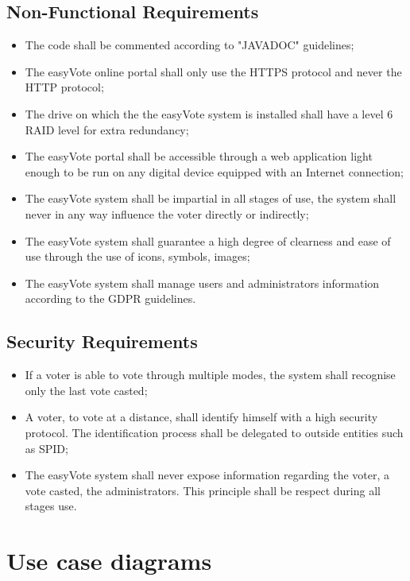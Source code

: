 \documentclass[11pt, oneside]{article}   	%
\begin{document}
\subsection{Non-Functional Requirements}
\begin{itemize}
\item The code shall be commented according to "JAVADOC" guidelines;
\item The easyVote online portal shall only use the HTTPS protocol and never the HTTP protocol;
\item The drive on which the the easyVote system is installed shall have a level 6 RAID level for extra redundancy;
\item The easyVote portal shall be accessible through a web application light enough to be run on any digital device equipped with an Internet connection;
\item The easyVote system shall be impartial in all stages of use, the system shall never in any way influence the voter directly or indirectly;
\item The easyVote system shall guarantee a high degree of clearness and ease of use through the use of icons, symbols, images;
\item The easyVote system shall manage users and administrators information according to the GDPR guidelines.
\end{itemize}

\subsection{Security Requirements}
\begin{itemize}
\item If a voter is able to vote through multiple modes, the system shall recognise only the last vote casted;
\item A voter, to vote at a distance, shall identify himself with a high security protocol. The identification process shall be delegated to outside entities such as SPID;
\item The easyVote system shall never expose information regarding the voter, a vote casted, the administrators. This principle shall be respect during all stages use.
\end{itemize}

\pagebreak 


\section{Use case diagrams}
\end{document}
